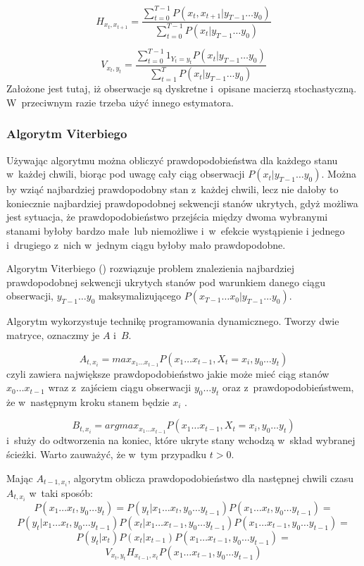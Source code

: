 $$H_{x_t, x_{t+1}} = \frac{\sum_{t=0}^{T-1} P(x_t, x_{t+1} | y_{T-1} \dots y_0)}{\sum_{t=0}^{T-1} P(x_t | y_{T-1} \dots y_0)}$$

$$V_{x_t, y_t} = \frac{\sum_{t=0}^{T-1} 1_{Y_t = y_t} P(x_t | y_{T-1} \dots y_0)}{\sum_{t=1}^T P(x_t | y_{T-1} \dots y_0)}$$
Założone jest tutaj, iż obserwacje są  dyskretne i~opisane macierzą stochastyczną. W~przeciwnym razie trzeba użyć innego estymatora.
\subsubsection{Algorytm Viterbiego}

Używając algorytmu  można obliczyć prawdopodobieństwa dla każdego stanu w~każdej chwili, biorąc
pod uwagę cały ciąg obserwacji $P(x_t | y_{T-1} \dots y_0)$. Można by wziąć najbardziej prawdopodobny stan z~każdej chwili,
lecz nie dałoby to koniecznie najbardziej prawdopodobnej sekwencji stanów ukrytych, gdyż możliwa jest sytuacja, że
prawdopodobieństwo przejścia między dwoma wybranymi stanami byłoby bardzo małe lub niemożliwe i~w~efekcie wystąpienie
i jednego i~drugiego z~nich w~jednym ciągu byłoby mało prawdopodobne.

Algorytm Viterbiego () rozwiązuje problem znalezienia najbardziej prawdopodobnej sekwencji ukrytych stanów pod warunkiem danego ciągu obserwacji, $y_{T-1} \dots y_0$ maksymalizującego $P(x_{T-1} \dots x_0 | y_{T-1} \dots y_0)$.

Algorytm wykorzystuje technikę programowania dynamicznego. Tworzy dwie matryce, oznaczmy je $A$ i~$B$.

$$A_{t,x_i} = max_{x_1 \dots x_{t-1}} P(x_1 \dots x_{t-1}, X_t = x_i, y_0 \dots y_t)$$
czyli zawiera największe prawdopodobieństwo jakie może mieć ciąg stanów $x_0 \dots x_{t-1}$ wraz z~zajściem ciągu obserwacji $y_0 \dots y_t$ oraz z~prawdopodobieństwem, że w~następnym kroku stanem będzie $x_i$ .

$$B_{t,x_i} = argmax_{x_1 \dots x_{t-1}} P(x_1 \dots x_{t-1}, X_t = x_i, y_0 \dots y_t)$$ i~służy do odtworzenia na koniec, które ukryte stany wchodzą w~skład wybranej ścieżki. Warto zauważyć, że w~tym przypadku $t > 0$.

Mając $A_{t-1,x_i}$, algorytm oblicza prawdopodobieństwo dla następnej chwili czasu $A_{t,x_i}$ w~taki sposób:
$$P(x_1 \dots x_t, y_0 \dots y_t) = P(y_t | x_1 \dots x_t, y_0 \dots y_{t-1}) P(x_1 \dots x_t, y_0 \dots y_{t-1}) =$$
$$P(y_t | x_1 \dots x_t, y_0 \dots y_{t-1}) P(x_t | x_1 \dots x_{t-1}, y_0 \dots y_{t-1}) P(x_1 \dots x_{t-1}, y_0 \dots y_{t-1}) =$$
$$P(y_t | x_t) P(x_t | x_{t-1}) P(x_1 \dots x_{t-1}, y_0 \dots y_{t-1}) =$$
$$V_{x_t, y_t} H_{x_{t-1}, x_t} P(x_1 \dots x_{t-1}, y_0 \dots y_{t-1})$$

